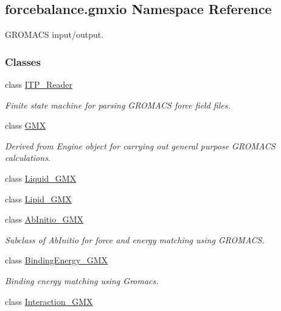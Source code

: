 \hypertarget{namespaceforcebalance_1_1gmxio}{\subsection{forcebalance.\-gmxio Namespace Reference}
\label{namespaceforcebalance_1_1gmxio}
}


G\-R\-O\-M\-A\-C\-S input/output.  


\subsubsection*{Classes}
\begin{DoxyCompactItemize}
\item 
class \hyperlink{classforcebalance_1_1gmxio_1_1ITP__Reader}{I\-T\-P\-\_\-\-Reader}
\begin{DoxyCompactList}\small\item\em Finite state machine for parsing G\-R\-O\-M\-A\-C\-S force field files. \end{DoxyCompactList}\item 
class \hyperlink{classforcebalance_1_1gmxio_1_1GMX}{G\-M\-X}
\begin{DoxyCompactList}\small\item\em Derived from Engine object for carrying out general purpose G\-R\-O\-M\-A\-C\-S calculations. \end{DoxyCompactList}\item 
class \hyperlink{classforcebalance_1_1gmxio_1_1Liquid__GMX}{Liquid\-\_\-\-G\-M\-X}
\item 
class \hyperlink{classforcebalance_1_1gmxio_1_1Lipid__GMX}{Lipid\-\_\-\-G\-M\-X}
\item 
class \hyperlink{classforcebalance_1_1gmxio_1_1AbInitio__GMX}{Ab\-Initio\-\_\-\-G\-M\-X}
\begin{DoxyCompactList}\small\item\em Subclass of Ab\-Initio for force and energy matching using G\-R\-O\-M\-A\-C\-S. \end{DoxyCompactList}\item 
class \hyperlink{classforcebalance_1_1gmxio_1_1BindingEnergy__GMX}{Binding\-Energy\-\_\-\-G\-M\-X}
\begin{DoxyCompactList}\small\item\em Binding energy matching using Gromacs. \end{DoxyCompactList}\item 
class \hyperlink{classforcebalance_1_1gmxio_1_1Interaction__GMX}{Interaction\-\_\-\-G\-M\-X}

\end{DoxyCompactItemize}

